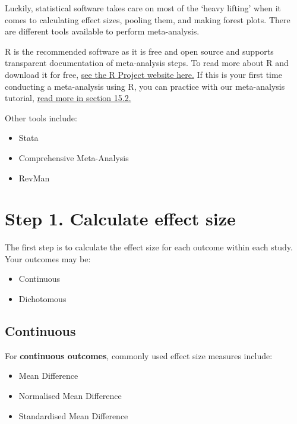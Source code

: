 \documentclass[
]{book}
\providecommand{\tightlist}{%
  \setlength{\itemsep}{0pt}\setlength{\parskip}{0pt}}
\begin{document}
Luckily, statistical software takes care on most of the `heavy lifting' when it comes to calculating effect sizes, pooling them, and making forest plots.
There are different tools available to perform meta-analysis.

R is the recommended software as it is free and open source and supports transparent documentation of meta-analysis steps. To read more about R and download it for free, \href{https://www.r-project.org/}{see the R Project website here.}
If this is your first time conducting a meta-analysis using R, you can practice with our meta-analysis tutorial, \protect\hyperlink{meta-analysis-tutorial}{read more in section 15.2.}

Other tools include:

\begin{itemize}
\tightlist
\item
  Stata
\item
  Comprehensive Meta-Analysis
\item
  RevMan
\end{itemize}

\hypertarget{step-1.-calculate-effect-size}{%
\section{Step 1. Calculate effect size}\label{step-1.-calculate-effect-size}}

The first step is to calculate the effect size for each outcome within each study. Your outcomes may be:

\begin{itemize}
\tightlist
\item
  Continuous
\item
  Dichotomous
\end{itemize}

\hypertarget{continuous}{%
\subsection{Continuous}\label{continuous}}

For \textbf{continuous outcomes}, commonly used effect size measures include:

\begin{itemize}
\tightlist
\item
  Mean Difference
\item
  Normalised Mean Difference
\item
  Standardised Mean Difference
\end{itemize}
\end{document}
